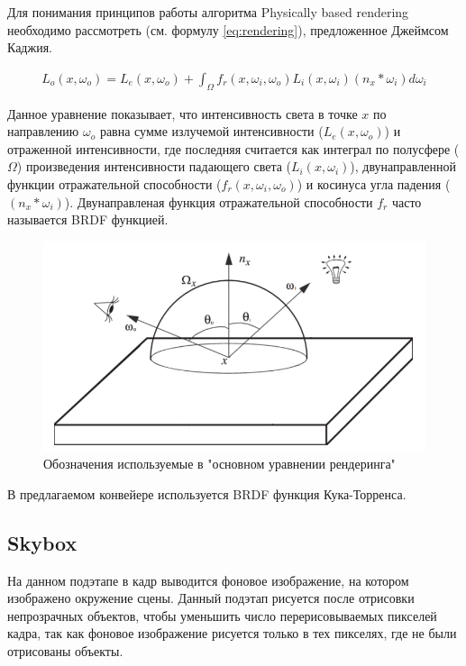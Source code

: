 			Для понимания принципов работы алгоритма Physically based rendering необходимо рассмотреть  (см. формулу \ref{eq:rendering}), предложенное Джеймсом Каджия. 
			
			\begin{equation}
				\label{eq:rendering}
				\begin{multlined}
					L_o(x, \omega_o) = L_e(x, \omega_o) + \int_{\Omega} f_r(x, \omega_i, \omega_o)L_i(x, \omega_i)(n_x * \omega_i)d\omega_i
				\end{multlined}
			\end{equation}
			
			Данное уравнение показывает, что интенсивность света в точке $x$ по направлению $\omega_o$ равна сумме излучемой интенсивности ($L_e(x, \omega_o)$) и отраженной интенсивности, где последняя считается как интеграл по полусфере ($\Omega$) произведения интенсивности падающего света ($L_i(x, \omega_i)$), двунаправленной функции отражательной способности ($f_r(x, \omega_i, \omega_o)$) и косинуса угла падения ($(n_x * \omega_i)$). Двунаправленая функция отражательной способности $f_r$ часто называется BRDF функцией. 
			
			\begin{figure}[ht!] 
				\center
				\includegraphics [scale=0.6] {my_folder/images//rendering_eq}	
				\caption{Обозначения используемые в "основном уравнении рендеринга"} 
				\label{fig:base_rendering}
			\end{figure}
			
			В предлагаемом конвейере используется BRDF функция Кука-Торренса.
	\subsection{Skybox} \label{ch3:render_pass:skybox}
		На данном подэтапе в кадр выводится фоновое изображение, на котором изображено окружение сцены. Данный подэтап рисуется после отрисовки непрозрачных объектов, чтобы уменьшить число перерисовываемых пикселей кадра, так как фоновое изображение рисуется только в тех пикселях, где не были отрисованы объекты. 
		
